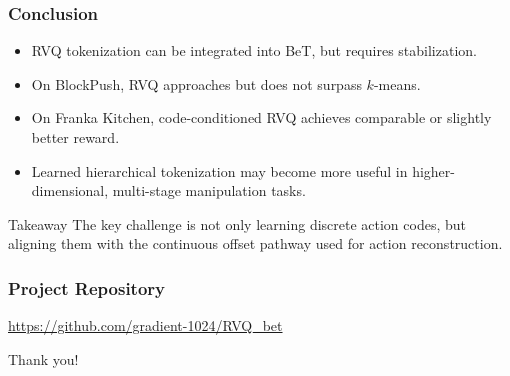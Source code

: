 \documentclass[aspectratio=169]{ctexbeamer}
\begin{document}
\begin{frame}
  \frametitle{Conclusion}
  \begin{itemize}
    \item RVQ tokenization can be integrated into BeT, but requires stabilization.
    \item On BlockPush, RVQ approaches but does not surpass $k$-means.
    \item On Franka Kitchen, code-conditioned RVQ achieves comparable or slightly better reward.
    \item Learned hierarchical tokenization may become more useful in higher-dimensional, multi-stage manipulation tasks.
  \end{itemize}
  \vspace{0.8em}
  \begin{block}{Takeaway}
    The key challenge is not only learning discrete action codes, but aligning them with the continuous offset pathway used for action reconstruction.
  \end{block}
\end{frame}

\begin{frame}
  \frametitle{Project Repository}
  \begin{center}
    \Large \url{https://github.com/gradient-1024/RVQ_bet}
  \end{center}
  \vspace{1em}
  \begin{center}
    \Huge Thank you!
  \end{center}
\end{frame}
\end{document}
